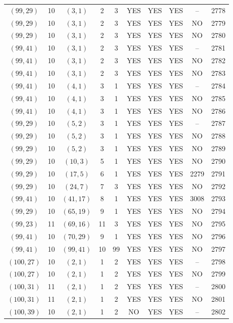 \begin{longtable}{|c|c|c|c|c|c|c|c|c|c|}
$(99, 29)$ & 10 & $(3, 1)$ & 2 & 3 & YES & YES & YES & -- & 2778\\
$(99, 29)$ & 10 & $(3, 1)$ & 2 & 3 & YES & YES & YES & NO & 2779\\
$(99, 29)$ & 10 & $(3, 1)$ & 2 & 3 & YES & YES & YES & NO & 2780\\
$(99, 41)$ & 10 & $(3, 1)$ & 2 & 3 & YES & YES & YES & -- & 2781\\
$(99, 41)$ & 10 & $(3, 1)$ & 2 & 3 & YES & YES & YES & NO & 2782\\
$(99, 41)$ & 10 & $(3, 1)$ & 2 & 3 & YES & YES & YES & NO & 2783\\
$(99, 41)$ & 10 & $(4, 1)$ & 3 & 1 & YES & YES & YES & -- & 2784\\
$(99, 41)$ & 10 & $(4, 1)$ & 3 & 1 & YES & YES & YES & NO & 2785\\
$(99, 41)$ & 10 & $(4, 1)$ & 3 & 1 & YES & YES & YES & NO & 2786\\
$(99, 29)$ & 10 & $(5, 2)$ & 3 & 1 & YES & YES & YES & -- & 2787\\
$(99, 29)$ & 10 & $(5, 2)$ & 3 & 1 & YES & YES & YES & NO & 2788\\
$(99, 29)$ & 10 & $(5, 2)$ & 3 & 1 & YES & YES & YES & NO & 2789\\
$(99, 29)$ & 10 & $(10, 3)$ & 5 & 1 & YES & YES & YES & NO & 2790\\
$(99, 29)$ & 10 & $(17, 5)$ & 6 & 1 & YES & YES & YES & 2279 & 2791\\
$(99, 29)$ & 10 & $(24, 7)$ & 7 & 3 & YES & YES & YES & NO & 2792\\
$(99, 41)$ & 10 & $(41, 17)$ & 8 & 1 & YES & YES & YES & 3008 & 2793\\
$(99, 29)$ & 10 & $(65, 19)$ & 9 & 1 & YES & YES & YES & NO & 2794\\
$(99, 23)$ & 11 & $(69, 16)$ & 11 & 3 & YES & YES & YES & NO & 2795\\
$(99, 41)$ & 10 & $(70, 29)$ & 9 & 1 & YES & YES & YES & NO & 2796\\
$(99, 41)$ & 10 & $(99, 41)$ & 10 & 99 & YES & YES & YES & NO & 2797\\
$(100, 27)$ & 10 & $(2, 1)$ & 1 & 2 & YES & YES & YES & -- & 2798\\
$(100, 27)$ & 10 & $(2, 1)$ & 1 & 2 & YES & YES & YES & NO & 2799\\
$(100, 31)$ & 11 & $(2, 1)$ & 1 & 2 & YES & YES & YES & -- & 2800\\
$(100, 31)$ & 11 & $(2, 1)$ & 1 & 2 & YES & YES & YES & NO & 2801\\
$(100, 39)$ & 10 & $(2, 1)$ & 1 & 2 & NO & YES & YES & -- & 2802\\

\end{longtable}
